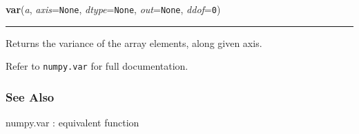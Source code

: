     \begin{boxedminipage}{\textwidth}

    \raggedright \textbf{var}(\textit{a}, \textit{axis}=\texttt{None}, \textit{dtype}=\texttt{None}, \textit{out}=\texttt{None}, \textit{ddof}=\texttt{0})

    \vspace{-1.5ex}

    \rule{\textwidth}{0.5\fboxrule}

Returns the variance of the array elements, along given axis.

Refer to \texttt{numpy.var} for full documentation.



\hypertarget{see-also}{}
\subsubsection*{See Also}

numpy.var : equivalent function
    \vspace{1ex}

    \end{boxedminipage}

    \label{numpy:ndarray:view}

    \vspace{0.5ex}

